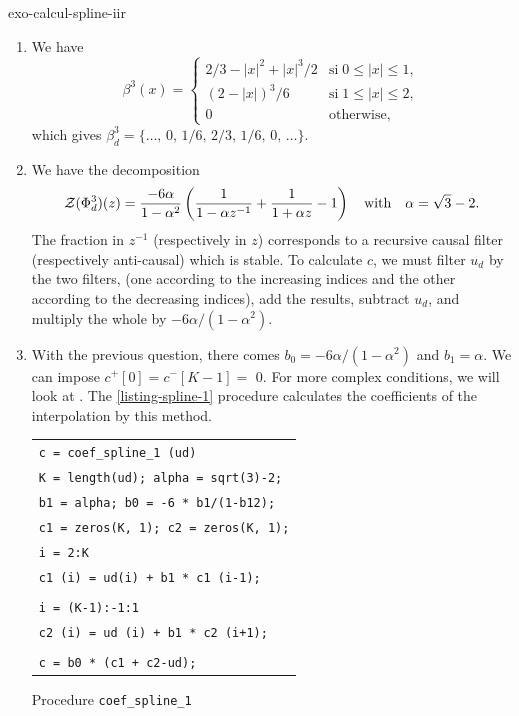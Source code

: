  
\begin{correction}{exo-calcul-spline-iir}
\begin{enumerate}
\item We have
\begin{equation*}
\beta^3 (x) = \left\{\begin{array}{ll} 2/3- | x |^2 + | x |^3/2 & \text{si} \; 0 \leq | x | \leq 1, \\(2- | x |)^3/6 & \text{si} \; 1 \leq | x | \leq 2, \\0 & \text{otherwise,} \end{array} \right.
\end{equation*}
which gives $ \beta_d^3 = \{\ldots, \, 0, \, 1/6, \, 2/3, \, 1/6, \, 0, \, \ldots\} $.
\item {}  We have the decomposition
\begin{equation*}
\mathcal{Z} (\Phi_d^3) (z) = \frac{-6 \alpha}{1- \alpha^2} \left(\frac{1}{1- \alpha z^{-1}} + \frac{1}{1+ \alpha z}-1 \right) \quad \text{with} \quad \alpha = \sqrt{3} -2.
\end{equation*}
The fraction in $ z^{-1} $ (respectively in $ z $) corresponds to a recursive causal filter (respectively anti-causal) which is stable. To calculate $ c $, we must filter $ u_d $ by the two filters, (one according to the increasing indices and the other according to the decreasing indices), add the results, subtract $ u_d $, and multiply the whole by $ -6 \alpha/(1- \alpha^2) $.
\item With the previous question, there comes $ b_0 = -6 \alpha/(1- \alpha^2) $ and $ b_1 = \alpha $. We can impose $ c^+ [0] = c^- [K-1] = $ 0. For more complex conditions, we will look at \cite{unser-spline}. The \Matlab{} \ref{listing-spline-1} procedure calculates the coefficients of the interpolation by this method.

\begin{listing} 
\begin{footnotesize}
{\upshape
\begin{tabular}{l} \texttt{\pfunction c = coef\_spline\_1 (ud)} \\
\texttt{K = length(ud); alpha = sqrt(3)-2;} \\
\texttt{b1 = alpha; b0 = -6 * b1/(1-b1{\hatverb}2);} \\
\texttt{c1 = zeros(K, 1); c2 = zeros(K, 1);} \\
\texttt{\pfor i = 2:K} \\
\quad \texttt{c1 (i) = ud(i) + b1 * c1 (i-1);} \\
\texttt{\pend} \\
\texttt{\pfor i = (K-1):-1:1} \\
\quad \texttt{c2 (i) = ud (i) + b1 * c2 (i+1);} \\
\texttt{\pend} \\
\texttt{c = b0 * (c1 + c2-ud);} \\
\end{tabular}
}
\end{footnotesize}
\caption{Procedure \texttt{\upshape coef\_spline\_1}}
\label{listing-spline-1}
\end{listing}
 

\end{enumerate}
\end{correction}
